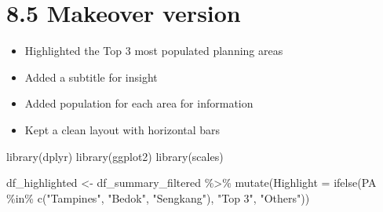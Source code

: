 \documentclass[
  letterpaper,
  DIV=11,
  numbers=noendperiod]{scrartcl}
\newenvironment{Shaded}{\begin{snugshade}}{\end{snugshade}}
\newcommand{\AttributeTok}[1]{\textcolor[rgb]{0.40,0.45,0.13}{#1}}
\newcommand{\FunctionTok}[1]{\textcolor[rgb]{0.28,0.35,0.67}{#1}}
\newcommand{\NormalTok}[1]{\textcolor[rgb]{0.00,0.23,0.31}{#1}}
\newcommand{\OtherTok}[1]{\textcolor[rgb]{0.00,0.23,0.31}{#1}}
\newcommand{\SpecialCharTok}[1]{\textcolor[rgb]{0.37,0.37,0.37}{#1}}
\newcommand{\StringTok}[1]{\textcolor[rgb]{0.13,0.47,0.30}{#1}}
\begin{document}
\section{8.5 Makeover version}\label{makeover-version}

\begin{itemize}
\item
  Highlighted the Top 3 most populated planning areas
\item
  Added a subtitle for insight
\item
  Added population for each area for information
\item
  Kept a clean layout with horizontal bars
\end{itemize}

\begin{Shaded}
\begin{Highlighting}[]
\FunctionTok{library}\NormalTok{(dplyr)}
\FunctionTok{library}\NormalTok{(ggplot2)}
\FunctionTok{library}\NormalTok{(scales)}

\NormalTok{df\_highlighted }\OtherTok{\textless{}{-}}\NormalTok{ df\_summary\_filtered }\SpecialCharTok{\%\textgreater{}\%}
  \FunctionTok{mutate}\NormalTok{(}\AttributeTok{Highlight =} \FunctionTok{ifelse}\NormalTok{(PA }\SpecialCharTok{\%in\%} \FunctionTok{c}\NormalTok{(}\StringTok{"Tampines"}\NormalTok{, }\StringTok{"Bedok"}\NormalTok{, }\StringTok{"Sengkang"}\NormalTok{), }\StringTok{"Top 3"}\NormalTok{, }\StringTok{"Others"}\NormalTok{))}


\end{Highlighting}
\end{Shaded}
\end{document}
